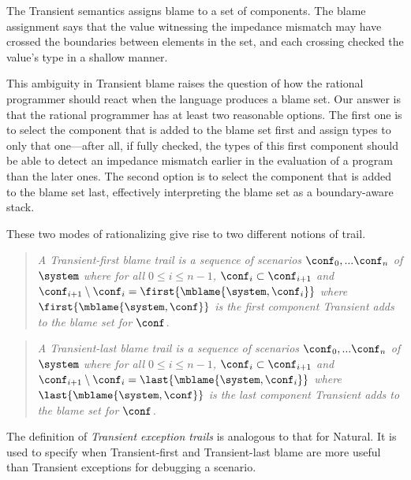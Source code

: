 
The Transient semantics assigns blame to a set of components. The blame
assignment says that the value witnessing the impedance mismatch may have
crossed the boundaries between elements in the set, and each crossing
checked the value's type in a shallow manner.

This ambiguity in Transient blame raises the question of how the rational
programmer should react when the language produces a blame set. Our answer
is that the rational programmer has at least two reasonable options. The first
one is to select the component that is added to the blame set first and
assign types to only that one---after all, if fully checked, the types of this
first component should be able to detect an impedance mismatch earlier in the
evaluation of a program than the later ones. The second option is to select the
component that is added to the blame set last, effectively interpreting the
blame set as a boundary-aware stack.

These two modes of rationalizing give rise to two different notions of trail.

\begin{quote}
\it A \emph{Transient-first blame trail} is a sequence of scenarios
$\conf_0,...\conf_n$ of $\system$ where for all $0 \leq i \leq n - 1$,
$\conf_i \subset \conf_{i+1}$ and $\conf_{i+1} \setminus \conf_i =
\first{\mblame{\system, \conf_i}}$ where $\first{\mblame{\system, \conf}}$ is the
first component Transient adds to the blame set for $\conf$.
\end{quote}

\begin{quote}
\it A \emph{Transient-last blame trail} is a sequence of scenarios
$\conf_0,...\conf_n$ of $\system$ where for all $0 \leq i \leq n - 1$,
$\conf_i \subset \conf_{i+1}$ and $\conf_{i+1} \setminus \conf_i =
  \last{\mblame{\system, \conf_i}}$ where $\last{\mblame{\system, \conf}}$ is the
last component Transient adds to the blame set for $\conf$.
\end{quote}

The definition of \emph{Transient exception trails} is analogous to that for
Natural. It is used to specify when Transient-first and Transient-last blame are
more useful than Transient exceptions for debugging a scenario.

